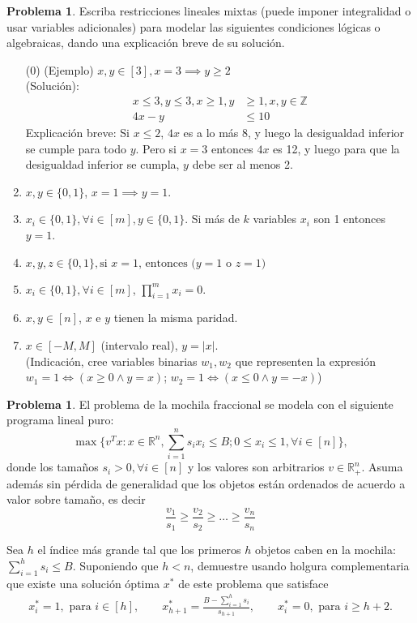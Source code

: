 \documentclass{article}
\newcommand{\RR}{\mathbb R}
\newcommand{\ZZ}{\mathbb Z}
\theoremstyle{plain}
\theoremstyle{definition}
\newtheorem{prob}[teo]{Problema}
\theoremstyle{Azul}
\begin{document}
\begin{prob}
Escriba restricciones lineales mixtas (puede imponer integralidad o usar variables adicionales) para modelar las siguientes condiciones lógicas o algebraicas, dando una explicación breve de su solución.


\begin{enumerate}[(1)]
\item[(0)] (Ejemplo)  $x, y\in [3], x=3 \implies y\ge 2$\\
(Solución):   \begin{align*}
x\leq 3, y\leq 3, x\ge 1, y&\ge 1, x, y\in \ZZ\\
4x-y&\leq 10
\end{align*}
Explicación breve: Si $x\leq 2$, $4x$ es a lo más 8, y luego la desigualdad inferior se cumple para todo $y$.
Pero si $x=3$ entonces $4x$ es 12, y luego para que la desigualdad inferior se cumpla, $y$ debe ser al menos 2.

\item $x, y\in \{0,1\}$, $x=1 \implies y=1$.

\item $x_i \in \{0,1\}, \forall i\in [m], y\in \{0,1\}$. Si más de $k$ variables $x_i$ son 1 entonces $y=1$.

\item $x, y, z\in \{0,1\}, \text{si $x=1$, entonces ($y=1$ o $z=1$)}$

\item $x_i \in \{0,1\}, \forall i\in [m]$, $\prod_{i=1}^m x_i = 0$.

\item $x, y\in [n]$, $x$ e $y$ tienen la misma paridad.

\item $x\in [-M,M]$ (intervalo real), $y=|x|$.\\
 (Indicación, cree variables binarias $w_1, w_2$ que representen la expresión $w_1=1 \iff (x\geq 0 \wedge y=x)$; $w_2=1 \iff (x\leq 0 \wedge y=-x)$)

\end{enumerate}
\end{prob}
\begin{prob} El problema de la mochila fraccional se modela con el siguiente programa lineal puro:
$$\max\{v^Tx\colon x\in \RR^n, \sum_{i=1}^n s_ix_i \leq B; 0\leq x_i\leq 1, \forall i\in [n]\},$$
donde los tamaños $s_i>0, \forall i\in [n]$ y los valores son arbitrarios $v\in \RR^n_+$. Asuma además sin pérdida de generalidad que los objetos están ordenados de acuerdo a valor sobre tamaño, es decir $$\frac{v_1}{s_1}\geq \frac{v_2}{s_2}\geq \dots \geq \frac{v_n}{s_n}$$

Sea $h$ el índice más grande tal que los primeros $h$ objetos caben en la mochila: $\sum_{i=1}^h s_i \leq B$. Suponiendo que $h<n$, demuestre usando holgura complementaria que existe una solución óptima $x^*$ de este problema que satisface
\begin{align*}
x_i^*=1, \text{ para } i\in [h], \qquad x^*_{h+1}=\frac{B-\sum_{i=1}^h s_i}{s_{h+1}}, \qquad x^*_{i}=0, \text{ para }  i\geq h+2.
\end{align*}
\end{prob}
\end{document}
